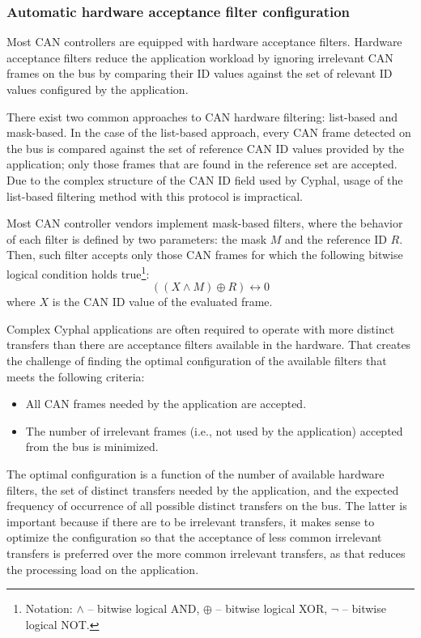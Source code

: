 \subsubsection{Automatic hardware acceptance filter configuration}

\begin{remark}[breakable]
    Most CAN controllers are equipped with hardware acceptance filters.
    Hardware acceptance filters reduce the application workload by ignoring irrelevant CAN frames on the bus
    by comparing their ID values against the set of relevant ID values configured by the application.

    There exist two common approaches to CAN hardware filtering:
    list-based and mask-based.
    In the case of the list-based approach, every CAN frame detected on the bus is compared
    against the set of reference CAN ID values provided by the application;
    only those frames that are found in the reference set are accepted.
    Due to the complex structure of the CAN ID field used by Cyphal,
    usage of the list-based filtering method with this protocol is impractical.

    Most CAN controller vendors implement mask-based filters,
    where the behavior of each filter is defined by two parameters: the mask $M$ and the reference ID $R$.
    Then, such filter accepts only those CAN frames for which the following bitwise logical condition holds
    true\footnote{Notation: $\land$ -- bitwise logical AND, $\oplus$ -- bitwise logical XOR,
    $\neg$ -- bitwise logical NOT.}:
    $$((X \land M) \oplus R) \leftrightarrow 0$$
    where $X$ is the CAN ID value of the evaluated frame.

    Complex Cyphal applications are often required to operate with more distinct transfers than there are
    acceptance filters available in the hardware.
    That creates the challenge of finding the optimal configuration of the available filters that meets the
    following criteria:
    \begin{itemize}
        \item All CAN frames needed by the application are accepted.
        \item The number of irrelevant frames (i.e., not used by the application) accepted from the bus is minimized.
    \end{itemize}

    The optimal configuration is a function of the number of available hardware filters,
    the set of distinct transfers needed by the application,
    and the expected frequency of occurrence of all possible distinct transfers on the bus.
    The latter is important because if there are to be irrelevant transfers,
    it makes sense to optimize the configuration so that the acceptance of less common irrelevant transfers
    is preferred over the more common irrelevant transfers, as that reduces the processing load on the application.


\end{remark}
